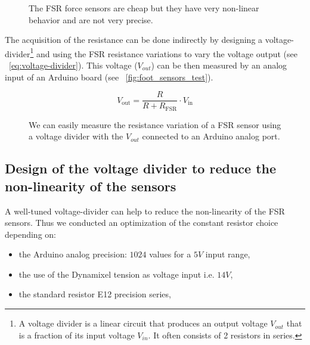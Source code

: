 \begin{figure}[h]
\centering
    \hfil
    \caption{The FSR force sensors are cheap but they have very non-linear behavior and are not very precise.}
    \label{fig:}
\end{figure}

The acquisition of the resistance can be done indirectly by designing a voltage-divider\footnote{A voltage divider is a linear circuit that produces an output voltage $V_{out}$ that is a fraction of its input voltage $V_{in}$. It often consists of 2 resistors in series.} and using the FSR resistance variations to vary the voltage output (see \equationname~\ref{eq:voltage-divider}). This voltage ($V_{out}$) can be then measured by an analog input of an Arduino board (see \figurename~\ref{fig:foot_sensors_test}).

\begin{equation}
    V_\mathrm{out} = \frac{R}{R+R_\mathrm{FSR}} \cdot V_\mathrm{in}
\label{eq:voltage-divider}
\end{equation}


\begin{figure}[!h]
\centering
    \hfil
    \caption{We can easily measure the resistance variation of a FSR sensor using a voltage divider with the $V_{out}$ connected to an Arduino analog port.}
    \label{fig:test_sensors}
\end{figure}

\subsection{Design of the voltage divider to reduce the non-linearity of the sensors } %

A well-tuned voltage-divider can help to reduce the non-linearity of the FSR sensors. Thus we conducted an optimization of the constant resistor choice depending on:
\begin{itemize}
    \item the Arduino analog precision: $1024$ values for a $5V$ input range,
    \item the use of the Dynamixel tension as voltage input i.e. $14V$,
    \item the standard resistor E12 precision series,
\end{itemize}

